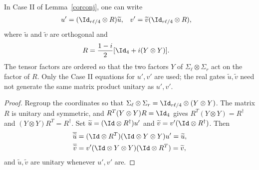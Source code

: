 \begin{lemma}
    \label{cor:sympl-to-orthogonal}
    \leanok
    In Case II of Lemma~\ref{corconj}, one can write
    \begin{align}
        u' & =(\Id_{r\ell/4}\otimes R)\widetilde u, &
        v' & =\widetilde v(\Id_{r\ell/4}\otimes R),
    \end{align}
    where $\widetilde u$ and $\widetilde v$ are orthogonal and
    \begin{align}
        R & =\frac{1-i}{2}[\Id_4+i(Y\otimes Y)].
    \end{align}
    The tensor factors are ordered so that the two factors $Y$ of
    $\Sigma_\ell\otimes\Sigma_r$ act on the factor of $R$. Only the Case II
    equations for $u',v'$ are used; the real gates $\widetilde u,\widetilde v$
    need not generate the same matrix product unitary as $u',v'$.
\end{lemma}

\begin{proof}
    \leanok
    Regroup the coordinates so that
    $\Sigma_\ell\otimes\Sigma_r=\Id_{r\ell/4}\otimes(Y\otimes Y)$. The matrix
    $R$ is unitary and symmetric, and $R^T(Y\otimes Y)R=\Id_4$ gives
    $R^T(Y\otimes Y)=R^\dagger$ and $(Y\otimes Y)R^T=R^\dagger$. Set
    $\widetilde u=(\Id\otimes R^\dagger)u'$ and
    $\widetilde v=v'(\Id\otimes R^\dagger)$. Then
    \begin{align}
        \overline{\widetilde u} & =(\Id\otimes R^T)(\Id\otimes Y\otimes Y)u'=\widetilde u, \\
        \overline{\widetilde v} & =v'(\Id\otimes Y\otimes Y)(\Id\otimes R^T)=\widetilde v,
    \end{align}
    and $\widetilde u,\widetilde v$ are unitary whenever $u',v'$ are.
\end{proof}

